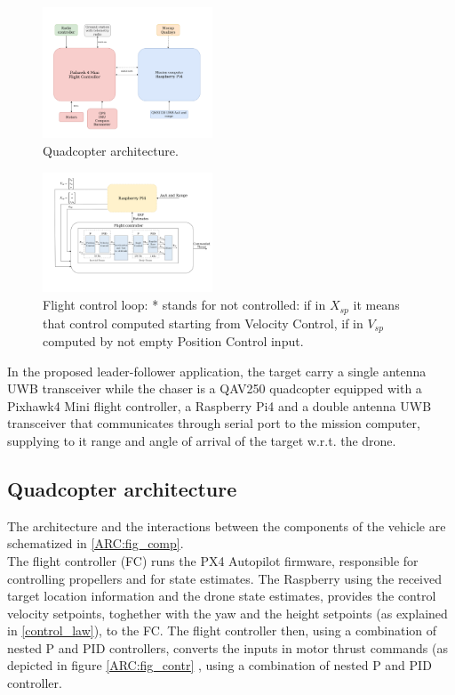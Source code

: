 \begin{figure}
    \centering
    \includegraphics[width=0.45\textwidth]{images/FCA.png}
    \caption{Quadcopter architecture.}
    \label{ARC:fig_comp}
\end{figure}

\begin{figure}
    \centering
    \includegraphics[width=0.45\textwidth]{images/Contr Diagram.png}
    \caption{Flight control loop: * stands for not controlled: if in \(X_{sp}\) it means that control computed starting from Velocity Control, if in \(V_{sp}\) computed by not empty Position Control input.}
    \label{ARC:fig_contr}
\end{figure}

In the proposed leader-follower application, the target carry a single antenna UWB transceiver while the chaser is a QAV250 quadcopter equipped with a Pixhawk4 Mini flight controller, a Raspberry Pi4 and a double antenna UWB transceiver that communicates through serial port to the mission computer, supplying to it range and angle of arrival of the target w.r.t. the drone.

\subsection{Quadcopter architecture}
The architecture and the interactions between the components of the vehicle are schematized in \autoref{ARC:fig_comp}.\\
The flight controller (FC) runs the PX4 Autopilot firmware, responsible for controlling propellers and for state estimates. The Raspberry using the received target location information and the drone state estimates, provides the control velocity setpoints, toghether with the yaw and the height setpoints (as explained in \autoref{control_law}), to the FC. The flight controller then, using a combination of nested P and PID controllers, converts the inputs in motor thrust commands (as depicted in figure \autoref{ARC:fig_contr} , using a combination of nested P and PID controller.\\

